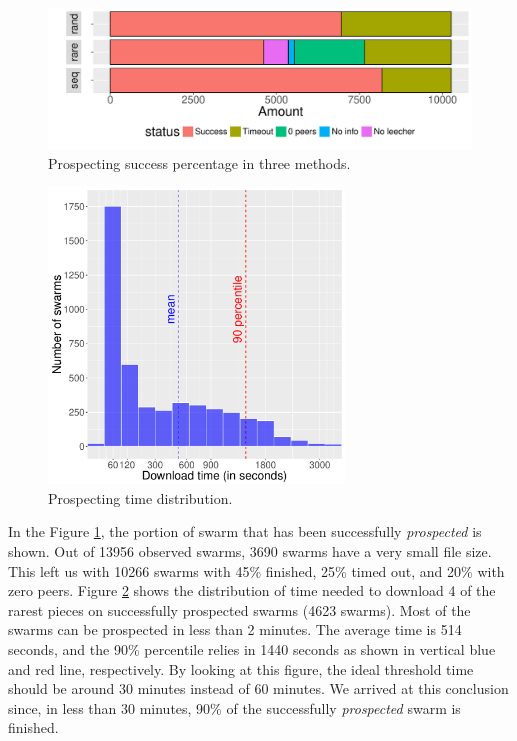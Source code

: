 \begin{figure}[h]
	\centering
	\includegraphics[width=\textwidth]{pics/results/dpredown_merge.pdf}
	\caption{Prospecting success percentage in three methods.}
	\label{fig:predownprecent}
\end{figure}

\begin{figure}[h]
	\centering
	\includegraphics[width=0.7\textwidth]{pics/results/hpredown.pdf}
	\caption{Prospecting time distribution.}
	\label{fig:predownhist}
\end{figure}

In the Figure \ref{fig:predownprecent}, the portion of swarm that has been successfully \textit{prospected} is shown. Out of 13956 observed swarms, 3690 swarms have a very small file size. This left us with 10266 swarms with 45\% finished, 25\% timed out, and 20\% with zero peers. Figure \ref{fig:predownhist} shows the distribution of time needed to download 4 of the rarest pieces on successfully prospected swarms (4623 swarms). Most of the swarms can be prospected in less than 2 minutes. The average time is 514 seconds, and the 90\% percentile relies in 1440 seconds as shown in vertical blue and red line, respectively. By looking at this figure, the ideal threshold time should be around 30 minutes instead of 60 minutes. We arrived at this conclusion since, in less than 30 minutes, 90\% of the successfully \textit{prospected} swarm is finished.

